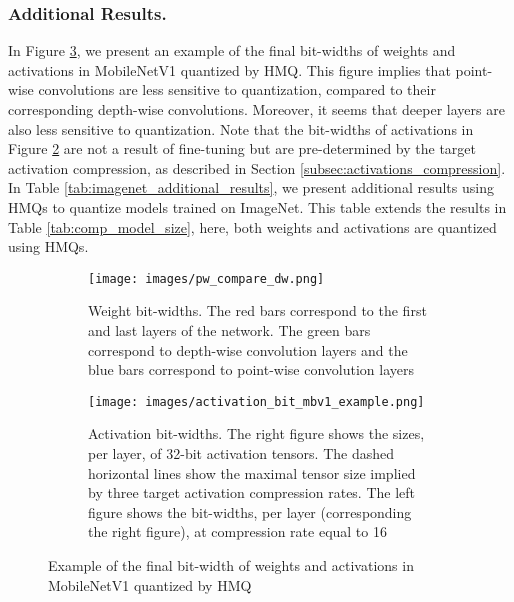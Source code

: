\documentclass{article}
\newcommand{\qb}{HMQ}
\begin{document}
\subsubsection{Additional Results.}
In Figure \ref{fig:mbv1_bit_width_example}, we present an example of the final bit-widths of weights and activations in MobileNetV1 quantized by \qb.
This figure implies that point-wise convolutions are less sensitive to quantization, compared to their corresponding depth-wise convolutions.
Moreover, it seems that deeper layers are also less sensitive to quantization. 
Note that the bit-widths of activations in Figure \ref{fig:mbv1_bit_width_act} are not a result of fine-tuning but are pre-determined by the target activation compression, as described in Section \ref{subsec:activations_compression}.
In Table \ref{tab:imagenet_additional_results}, we present additional results using \qb s to quantize models trained on ImageNet.
This table extends the results in Table \ref{tab:comp_model_size}, here, both weights and activations are quantized using \qb s.
\begin{figure}[h]
	\centering
	\begin{subfigure}{.48\textwidth}
		\centering
		\texttt{[image: images/pw\_compare\_dw.png]}
		\caption{
			Weight bit-widths. 
			The red bars correspond to the first and last layers of the network. 
			The green bars correspond to depth-wise convolution layers and the blue bars correspond to point-wise convolution layers
		}
		\label{fig:mbv1_bit_width}
	\end{subfigure}
	\hfill
	\begin{subfigure}{.48\textwidth}
		\centering
		\texttt{[image: images/activation\_bit\_mbv1\_example.png]}
		\caption{
			Activation bit-widths. 
			The right figure shows the sizes, per layer, of 32-bit activation tensors. 
			The dashed horizontal lines show the maximal tensor size implied by three target activation compression rates.
			The left figure shows the bit-widths, per layer (corresponding the right figure), at compression rate equal to 16
		}
		\label{fig:mbv1_bit_width_act}
	\end{subfigure}
	\caption{Example of the final bit-width of weights and activations in MobileNetV1 quantized by \qb} 
	\label{fig:mbv1_bit_width_example}
\end{figure}
\end{document}
